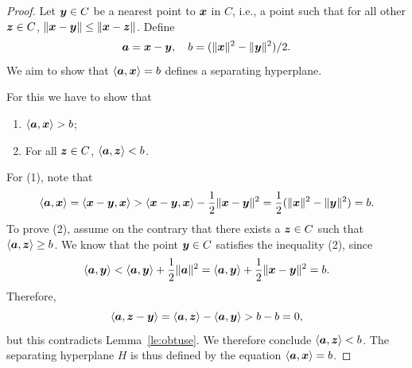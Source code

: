 \begin{proof}
 Let $\bm{y}\in C$ be a nearest point to $\bm{x}$ in $C$, i.e., a point such that for all other $\bm{z}\in C$, $\Vert {\bm{x}-\bm{y}}\Vert\leq \Vert {\bm{x}-\bm{z}}\Vert$. Define
 \begin{equation*}
  \bm{a}= \bm{x}-\bm{y}, \quad b = (\Vert {\bm{x}}\Vert^2-\Vert {\bm{y}}\Vert^2)/2.
 \end{equation*}
We aim to show that $\langle {\bm{a}}, {\bm{x}} \rangle = b$ defines a separating hyperplane. 

For this we have to show that
\begin{enumerate}
 \item $\langle {\bm{a}}, {\bm{x}} \rangle>b$;
 \item For all $\bm{z}\in C$, $\langle {\bm{a}}, {\bm{z}} \rangle<b$.
\end{enumerate}
For (1), note that 
\begin{equation*}
 \langle {\bm{a}}, {\bm{x}} \rangle = \langle {\bm{x}-\bm{y}}, {\bm{x}} \rangle>\langle {\bm{x}-\bm{y}}, {\bm{x}} \rangle-\frac{1}{2}\Vert {\bm{x}-\bm{y}}\Vert^2 = \frac{1}{2}(\Vert {\bm{x}}\Vert^2-\Vert {\bm{y}}\Vert^2) = b.
\end{equation*}
To prove (2), assume on the contrary that there exists a $\bm{z}\in C$ such that $\langle {\bm{a}}, {\bm{z}} \rangle\geq b$. We know that the point $\bm{y}\in C$ satisfies the inequality (2), since
\begin{equation*}
 \langle {\bm{a}}, {\bm{y}} \rangle < \langle {\bm{a}}, {\bm{y}} \rangle+\frac{1}{2}\Vert {\bm{a}}\Vert^2 = \langle {\bm{a}}, {\bm{y}} \rangle+\frac{1}{2}\Vert {\bm{x}-\bm{y}}\Vert^2 = b.
\end{equation*}
Therefore, 
\begin{equation*}
 \langle {\bm{a}}, {\bm{z}-\bm{y}} \rangle = \langle {\bm{a}}, {\bm{z}} \rangle-\langle {\bm{a}}, {\bm{y}} \rangle > b-b = 0,
\end{equation*}
but this contradicts Lemma~\ref{le:obtuse}. We therefore conclude $\langle {\bm{a}}, {\bm{z}} \rangle<b$. The separating hyperplane $H$ is thus defined by the equation $\langle {\bm{a}}, {\bm{x}} \rangle=b$. 
\end{proof}

